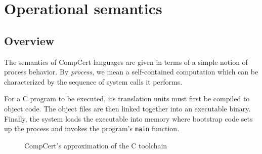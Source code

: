 \documentclass[sigplan,10pt,review,anonymous]{acmart}
\begin{document}

\section{Operational semantics} \label{sec:sem} %


\subsection{Overview} \label{sec:sem:overview} %

The semantics of CompCert languages
are given in terms of a simple notion of process behavior.
By \emph{process}, we mean a self-contained computation
which can be characterized by
the sequence of system calls it performs.

For a C program to be executed,
its translation units must first be compiled to object code.
The object files are then linked together
into an executable binary.
Finally, the system loads the executable into memory
where bootstrap code sets up the process
and invokes the program's \texttt{main} function.

\begin{figure} %
    \caption{CompCert's approximation of the C toolchain}
    \label{fig:process}
\end{figure}
\end{document}
